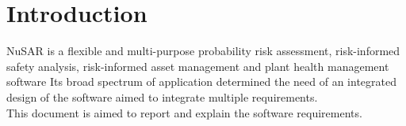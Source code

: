 \section{Introduction}
NuSAR is a flexible and multi-purpose probability risk assessment, risk-informed safety analysis, risk-informed asset
management and plant health management software
Its broad spectrum of application determined the need of an integrated design
of the software aimed to integrate multiple requirements.
\\This document is aimed to report and explain the software requirements.
